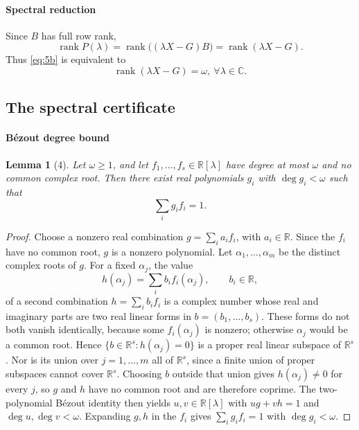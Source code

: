 \documentclass[journal]{IEEEtran}
\theoremstyle{plainn}
\newtheorem{lem}{Lemma}
\theoremstyle{remark}
\begin{document}
\paragraph{Spectral reduction}\label{sec:spectral}
Since $B$ has full row rank,
\begin{equation}
	\operatorname{rank}P(\lambda)
	=\operatorname{rank}\bigl((\lambda X-G)B\bigr)
	=\operatorname{rank}(\lambda X-G).
\end{equation}
Thus \eqref{eq:5b} is equivalent to
\begin{equation}
	\operatorname{rank}(\lambda X-G)=\omega,\ 
	\forall\lambda\in\mathbb C.
\end{equation}


\subsection{The spectral certificate}\label{sec:spectrum}
\paragraph{B\'ezout degree bound}\label{sec:bezout}
\begin{lem}[4]\label{lem:bezout}
	Let $\omega\ge1$, and let $f_1,\ldots,f_s\in\mathbb R[\lambda]$ have
	degree at most $\omega$ and no common complex root. Then there exist
	real polynomials $g_i$ with $\deg g_i<\omega$ such that
	\begin{equation}
		\sum_i g_i f_i=1.
	\end{equation}
\end{lem}

\begin{proof}
	Choose a nonzero real combination $g=\sum_i a_if_i$, with
	$a_i\in\mathbb R$. Since the $f_i$ have no common root, $g$ is a
	nonzero polynomial. Let $\alpha_1,\dots,\alpha_m$ be the distinct
	complex roots of $g$. For a fixed $\alpha_j$, the value
	\begin{equation}
	h(\alpha_j)=\sum_i b_if_i(\alpha_j),
	\qquad b_i\in\mathbb R,
	\end{equation}
	of a second combination $h=\sum_i b_if_i$ is a complex number whose
	real and imaginary parts are two real linear forms in
	$b=(b_1,\dots,b_s)$. These forms do not both vanish identically,
	because some $f_i(\alpha_j)$ is nonzero; otherwise $\alpha_j$ would
	be a common root. Hence
	$\{b\in\mathbb R^s:h(\alpha_j)=0\}$ is a proper real linear subspace
	of $\mathbb R^s$. Nor is its union over $j=1,\dots,m$ all of
	$\mathbb R^s$, since a finite union of proper subspaces cannot cover
	$\mathbb R^s$. Choosing $b$ outside that union gives
	$h(\alpha_j)\neq0$ for every $j$, so $g$ and $h$ have no common
	root and are therefore coprime. The two-polynomial B\'ezout identity
	then yields $u,v\in\mathbb R[\lambda]$ with $ug+vh=1$ and
	$\deg u,\deg v<\omega$. Expanding $g,h$ in the $f_i$ gives
	$\sum_i g_i f_i=1$ with $\deg g_i<\omega$.
\end{proof}
\end{document}
